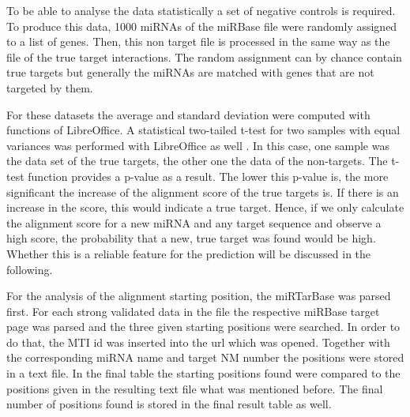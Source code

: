 \documentclass[12pt]{article}
\begin{document}
To be able to analyse the data statistically a set of negative controls is required. To produce this data, 1000 miRNAs of the miRBase file were randomly assigned to a list of genes. Then, this non target file is processed in the same way as the file of the true target interactions. The random assignment can by chance contain true targets but generally the miRNAs are matched with genes that are not targeted by them. 

For these datasets the average and standard deviation were computed with functions of LibreOffice. A statistical two-tailed t-test for two samples with equal variances was performed with LibreOffice as well \cite{ttest}. In this case, one sample was the data set of the true targets, the other one the data of the non-targets. The t-test function provides a p-value as a result. The lower this p-value is, the more significant the increase of the alignment score of the true targets is. If there is an increase in the score, this would indicate a true target. Hence, if we only calculate the alignment score for a new miRNA and any target sequence and observe a high score, the probability that a new, true target was found would be high. Whether this is a reliable feature for the prediction will be discussed in the following.

For the analysis of the alignment starting position, the miRTarBase was parsed first. For each strong validated data in the file the respective miRBase target page was parsed and the three given starting positions were searched. In order to do that, the MTI id was inserted into the url which was opened. Together with the corresponding miRNA name and target NM number the positions were stored in a text file. In the final table the starting positions found were compared to the positions given in the resulting text file what was mentioned before. The final number of positions found is stored in the final result table as well. 



\vspace{1cm}
\end{document}
